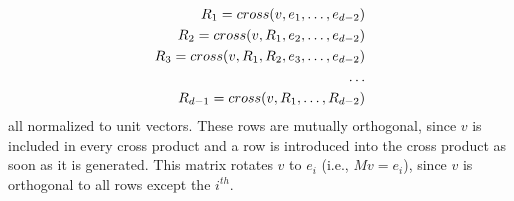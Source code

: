 \documentclass[10pt]{article}
\begin{document}
\begin{eqnarray}
\label{eqn:R1}
R_1 = cross (v,e_1,         \ldots,e_{d-2}) \\
R_2 = cross (v,R_1,e_2,     \ldots,e_{d-2}) \\
R_3 = cross (v,R_1,R_2,e_3, \ldots,e_{d-2}) \\
\ldots \hfill \\
\label{eqn:Rlast}
R_{d-1} = cross (v,R_1,\ldots,R_{d-2})
\end{eqnarray}
all normalized to unit vectors.
These rows are mutually orthogonal, since $v$ is included in every cross product
and a row is introduced into the cross product as soon as it is generated.
This matrix rotates $v$ to $e_i$ (i.e., $Mv = e_i$), 
since $v$ is orthogonal to all rows except the $i^{th}$.
\end{document}
